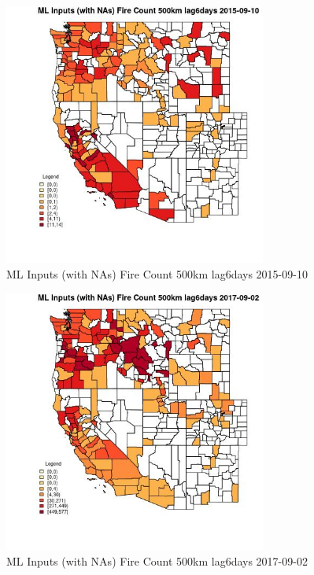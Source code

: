 \begin{figure} 
\centering  
\includegraphics[width=0.77\textwidth]{Code_Outputs/Report_ML_input_PM25_Step4_part_e_de_duplicated_aves_compiled_2019-05-21wNAs_CountyFire_Count_500km_lag6daysMean2015-09-10.jpg} 
\caption{\label{fig:Report_ML_input_PM25_Step4_part_e_de_duplicated_aves_compiled_2019-05-21wNAsCountyFire_Count_500km_lag6daysMean2015-09-10}ML Inputs (with NAs) Fire Count 500km lag6days 2015-09-10} 
\end{figure} 
 

\begin{figure} 
\centering  
\includegraphics[width=0.77\textwidth]{Code_Outputs/Report_ML_input_PM25_Step4_part_e_de_duplicated_aves_compiled_2019-05-21wNAs_CountyFire_Count_500km_lag6daysMean2017-09-02.jpg} 
\caption{\label{fig:Report_ML_input_PM25_Step4_part_e_de_duplicated_aves_compiled_2019-05-21wNAsCountyFire_Count_500km_lag6daysMean2017-09-02}ML Inputs (with NAs) Fire Count 500km lag6days 2017-09-02} 
\end{figure} 
 

